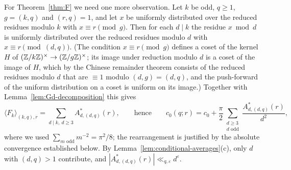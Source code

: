 For Theorem~\ref{thm:F} we need one more observation. Let $k$ be odd, $q\ge 1$, $g=(k,q)$ and $(r,q)=1$, and let $x$ be uniformly distributed over the reduced residues modulo $k$ with $x\equiv r\pmod g$. Then for each $d\mid k$ the residue $x\bmod d$ is uniformly distributed over the reduced residues modulo $d$ with $x\equiv r\pmod{(d,q)}$. (The condition $x\equiv r\pmod g$ defines a coset of the kernel $H$ of $(\mathbb{Z}/k\mathbb{Z})^\times\to(\mathbb{Z}/g\mathbb{Z})^\times$; its image under reduction modulo $d$ is a coset of the image of $H$, which by the Chinese remainder theorem consists of the reduced residues modulo $d$ that are $\equiv 1$ modulo $(d,g)=(d,q)$, and the push-forward of the uniform distribution on a coset is uniform on its image.) Together with Lemma~\ref{lem:Gd-decomposition} this gives
\begin{equation}\label{eq:c0qr-series}
\langle F_k\rangle_{(k,q),r}=\sum_{d\mid k,\ d\ge 3}A^*_{d,(d,q)}(r),\qquad\text{hence}\qquad c_0(q;r)=c_0+\frac\pi2\sum_{\substack{d\ge 3\\ d\text{ odd}}}\frac{A^*_{d,(d,q)}(r)}{d^2},
\end{equation}
where we used $\sum_{m\text{ odd}}m^{-2}=\pi^2/8$; the rearrangement is justified by the absolute convergence established below. By Lemma~\ref{lem:conditional-averages}(c), only $d$ with $(d,q)>1$ contribute, and $|A^*_{d,(d,q)}(r)|\ll_{q,\varepsilon}d^\varepsilon$.

